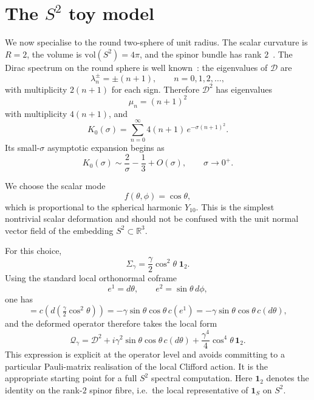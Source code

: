 \documentclass[11pt,a4paper]{article}
\numberwithin{equation}{section}
\theoremstyle{definition}
\newcommand{\cD}{\mathcal{D}}
\newcommand{\Qg}{\mathcal{Q}_\gamma}
\newcommand{\Sig}{\Sigma}
\begin{document}
\section{The $S^2$ toy model}
\label{sec:S2}

We now specialise to the round two-sphere of unit radius. The scalar
curvature is $R=2$, the volume is $\mathrm{vol}(S^2)=4\pi$, and the
spinor bundle has rank $2$~\cite{LawsonMichelsohn1989}. The Dirac spectrum
on the round sphere is well known~\cite{CamporesiHiguchi1996}: the
eigenvalues of $\cD$ are
\begin{equation}
\lambda_n^\pm=\pm(n+1),
\qquad n=0,1,2,\dots,
\end{equation}
with multiplicity $2(n+1)$ for each sign. Therefore $\cD^2$ has
eigenvalues
\begin{equation}
\mu_n=(n+1)^2
\end{equation}
with multiplicity $4(n+1)$, and
\begin{equation}
K_0(\sigma)=\sum_{n=0}^\infty 4(n+1)\,e^{-\sigma(n+1)^2}.
\end{equation}
Its small-$\sigma$ asymptotic expansion begins as
\begin{equation}
K_0(\sigma)\sim \frac{2}{\sigma}-\frac{1}{3}+O(\sigma),
\qquad \sigma\to 0^+.
\label{eq:K0s2}
\end{equation}

We choose the scalar mode
\begin{equation}
f(\theta,\phi)=\cos\theta,
\end{equation}
which is proportional to the spherical harmonic $Y_{10}$. This is the
simplest nontrivial scalar deformation and should not be confused with the
unit normal vector field of the embedding $S^2\subset \mathbb{R}^3$.

For this choice,
\begin{equation}
\Sig_\gamma=\frac{\gamma}{2}\cos^2\!\theta\;\mathbf{1}_2.
\end{equation}
Using the standard local orthonormal coframe
\begin{equation}
e^1=d\theta,\qquad e^2=\sin\theta\,d\phi,
\end{equation}
one has
\begin{equation}
[\cD,\Sig]
=c\!\left(d\!\left(\tfrac{\gamma}{2}\cos^2\theta\right)\right)
=-\gamma\sin\theta\cos\theta\,c(e^1)
=-\gamma\sin\theta\cos\theta\,c(d\theta),
\end{equation}
and the deformed operator therefore takes the local form
\begin{equation}
\Qg
=\cD^2+i\gamma^2\sin\theta\cos\theta\,c(d\theta)
+\frac{\gamma^4}{4}\cos^4\!\theta\,\mathbf{1}_2.
\label{eq:QgS2}
\end{equation}
This expression is explicit at the operator level and avoids committing to
a particular Pauli-matrix realisation of the local Clifford action. It is
the appropriate starting point for a full $S^2$ spectral computation.
Here $\mathbf{1}_2$ denotes the identity on the rank-$2$ spinor fibre,
i.e.\ the local representative of $\mathbf{1}_S$ on $S^2$.
\end{document}

